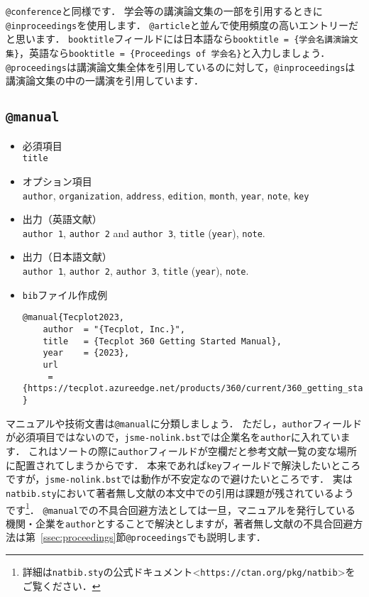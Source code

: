 \documentclass[a4paper,fleqn,uplatex,dvipdfmx]{jsarticle}
\makeatletter
\newcommand{\jsmefile}{\texttt{jsme-nolink.bst}}
\newcommand{\ttarticle}{\texttt{@article}}
\newcommand{\ttconference}{\texttt{@conference}}
\newcommand{\ttinproceedings}{\texttt{@inproceedings}}
\newcommand{\ttmanual}{\texttt{@manual}}
\newcommand{\ttproceedings}{\texttt{@proceedings}}
\makeatother
\begin{document}
\ttconference と同様です．
学会等の講演論文集の一部を引用するときに\ttinproceedings を使用します．
\ttarticle と並んで使用頻度の高いエントリーだと思います．
\verb|booktitle|フィールドには日本語なら\texttt{booktitle = \{\colorbox[gray]{0.8}{学会名}講演論文集\}}，英語なら\texttt{booktitle = \{Proceedings of \colorbox[gray]{0.8}{学会名}\}}と入力しましょう．
\ttproceedings は講演論文集全体を引用しているのに対して，\ttinproceedings は講演論文集の中の一講演を引用しています．


\subsection{\ttmanual}
\label{ssec:manual}
\begin{screen}
    \begin{itemize}
        \item 必須項目 \\
        \verb|title|
        \item オプション項目 \\
        \verb|author|, \verb|organization|, \verb|address|, \verb|edition|, \verb|month|, \verb|year|, \verb|note|, \verb|key|
        \item 出力（英語文献） \\
            \colorbox[gray]{0.8}{\texttt{author 1}}, \colorbox[gray]{0.8}{\texttt{author 2}} and \colorbox[gray]{0.8}{\texttt{author 3}}, \colorbox[gray]{0.8}{\texttt{title}} (\colorbox[gray]{0.8}{\texttt{year}}), \colorbox[gray]{0.8}{\texttt{note}}.
        \item 出力（日本語文献） \\
            \colorbox[gray]{0.8}{\texttt{author 1}}, \colorbox[gray]{0.8}{\texttt{author 2}}, \colorbox[gray]{0.8}{\texttt{author 3}}, \colorbox[gray]{0.8}{\texttt{title}} (\colorbox[gray]{0.8}{\texttt{year}}), \colorbox[gray]{0.8}{\texttt{note}}.
        \item \verb|bib|ファイル作成例 \vspace{-3mm}
\begin{verbatim}
@manual{Tecplot2023,
    author  = "{Tecplot, Inc.}",
    title   = {Tecplot 360 Getting Started Manual},
    year    = {2023},
    url    
     = {https://tecplot.azureedge.net/products/360/current/360_getting_started.pdf}
}
\end{verbatim}
    \end{itemize}
\end{screen}

マニュアルや技術文書は\ttmanual に分類しましょう．
ただし，\verb|author|フィールドが必須項目ではないので，\jsmefile では企業名を\verb|author|に入れています．
これはソートの際に\verb|author|フィールドが空欄だと参考文献一覧の変な場所に配置されてしまうからです．
本来であれば\verb|key|フィールドで解決したいところですが，\jsmefile では動作が不安定なので避けたいところです．
実は\verb|natbib.sty|において著者無し文献の本文中での引用は課題が残されているようです\footnote{詳細は\verb|natbib.sty|の公式ドキュメント\textless\verb|https://ctan.org/pkg/natbib|\textgreater をご覧ください．}．
\ttmanual での不具合回避方法としては一旦，マニュアルを発行している機関・企業を\verb|author|とすることで解決としますが，著者無し文献の不具合回避方法は第~\ref{ssec:proceedings}節\ttproceedings でも説明します．
\end{document}
